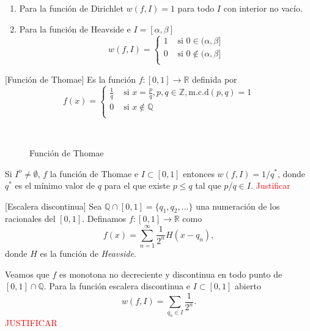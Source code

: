 \begin{ejemplo}{} 
\begin{enumerate}
 \item Para la función de Dirichlet $w(f,I)=1$ para todo $I$ con interior no vacío.
 \item Para la función de Heavside e $I=[\alpha,\beta]$
 \[
  w(f,I)=\begin{cases}
          1 & \text{ si } 0\in (\alpha,\beta]\\
          0 & \text{ si } 0\notin (\alpha,\beta]\\
         \end{cases}
 \]
\end{enumerate}
\end{ejemplo}






\begin{ejemplo}{}[Función de Thomae] Es la función $f:[0,1]\to\mathbb{R}$ definida por 
\[
 f(x)=\begin{cases} \frac{1}{q} & \text{ si } x=\frac{p}{q},p,q\in\mathbb{Z}, \text{m.c.d}(p,q)=1
 \\0 & \text{ si }   x\notin\mathbb{Q}\\
\end{cases}
\]

\begin{figure}[H]
\\
\caption{Función de Thomae}
\end{figure}


Si $I^o\neq\emptyset$, $f$ la función de Thomae e $I\subset [0,1]$ entonces 
     $ w(f,I)=1/q^*$, donde $q^*$ es el mínimo valor de $q$ para el que existe $p\leq q$ tal que $p/q\in I$. \textcolor{red}{Justificar}


\end{ejemplo}

 \begin{ejemplo}{}[Escalera discontinua] Sea $\mathbb{Q}\cap [0,1]=\{q_1,q_2,\ldots\}$ una numeración de los racionales del $[0,1]$. Definamos $f:[0,1]\to\mathbb{R}$ como
 \[
  f(x)=\sum_{n=1}^{\infty}\frac{1}{2^n}H(x-q_n),
 \]
donde $H$ es la función de \emph{Heavside}. 

Veamos que $f$ es monotona no decreciente y discontinua en todo punto de $[0,1]\cap \mathbb{Q}$. 
 Para la función escalera discontinua e $I\subset [0,1]$ abierto
  \[
   w(f,I)=\sum_{q_n\in I}\frac{1}{2^n}.
  \]
  \textcolor{red}{JUSTIFICAR}


\end{ejemplo}










